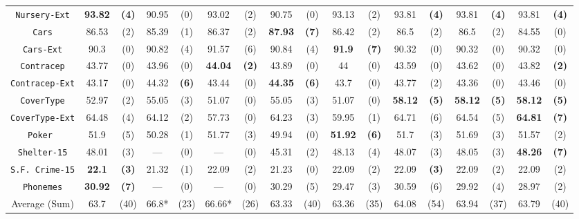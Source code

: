 \begin{sidewaystable*}[ph!]
\begin{tabular}{c|cc|cc|cc|cc|cc|cc|cc|cc}
{\tt Nursery-Ext}   &{\bf93.82}&{\bf(4)}& 90.95    & (0)    & 93.02    & (2)    & 90.75    & (0)    & 93.13    & (2)    & 93.81    &{\bf(4)}          & 93.81    & {\bf(4)} & 93.81    & {\bf(4)} \\
{\tt Cars}          & 86.53    & (2)    & 85.39    & (1)    & 86.37    & (2)    &{\bf87.93}&{\bf(7)}& 86.42    & (2)    & 86.5     & (2)              & 86.5     & (2)      & 84.55    & (0)      \\
{\tt Cars-Ext}      & 90.3     & (0)    & 90.82    & (4)    & 91.57    & (6)    & 90.84    & (4)    &{\bf 91.9}&{\bf(7)}& 90.32    & (0)              & 90.32    & (0)      & 90.32    & (0)      \\
{\tt Contracep}     & 43.77    & (0)    & 43.96    & (0)    &{\bf44.04}&{\bf(2)}& 43.89    & (0)    & 44       & (0)    & 43.59    & (0)              & 43.62    & (0)      & 43.82    & {\bf(2)} \\
{\tt Contracep-Ext} & 43.17    & (0)    & 44.32    &{\bf(6)}& 43.44    & (0)    &{\bf44.35}&{\bf(6)}& 43.7     & (0)    & 43.77    & (2)              & 43.36    & (0)      & 43.46    & (0)      \\
{\tt CoverType}     & 52.97    & (2)    & 55.05    & (3)    & 51.07    & (0)    & 55.05    & (3)    & 51.07    & (0)    &{\bf58.12}&{\bf(5)}          &{\bf58.12}& {\bf(5)} &{\bf58.12}& {\bf(5)} \\
{\tt CoverType-Ext} & 64.48    & (4)    & 64.12    & (2)    & 57.73    & (0)    & 64.23    & (3)    & 59.95    & (1)    & 64.71    & (6)              & 64.54    & (5)      &{\bf64.81}& {\bf(7)} \\
{\tt Poker }        & 51.9     & (5)    & 50.28    & (1)    & 51.77    & (3)    & 49.94    & (0)    &{\bf51.92}&{\bf(6)}& 51.7     & (3)              & 51.69    & (3)      & 51.57    & (2)      \\
{\tt Shelter-15}    & 48.01    & (3)    & ---      & (0)    & ---      & (0)    & 45.31    & (2)    & 48.13    & (4)    & 48.07    & (3)              & 48.05    & (3)      &{\bf48.26}& {\bf(7)} \\  
{\tt S.F. Crime-15} &{\bf22.1} &{\bf(3)}& 21.32    & (1)    & 22.09    & (2)    & 21.23    & (0)    & 22.09    & (2)    & 22.09    &{\bf(3)}          & 22.09    & (2)      & 22.09    & (2)      \\
{\tt Phonemes}      &{\bf30.92}&{\bf(7)}& ---      & (0)    & ---      & (0)    & 30.29    & (5)    & 29.47    & (3)    & 30.59    & (6)              & 29.92    & (4)      & 28.97    & (2)      \\
\hline
Average (Sum)       &  63.7    & (40)   & 66.8*    & (23)   & 66.66*   & (26)   & 63.33    & (40)   & 63.36    & (35)   & 64.08    & (54)             & 63.94    & (37)     & 63.79    & (40)


\end{tabular}
\end{sidewaystable*}

